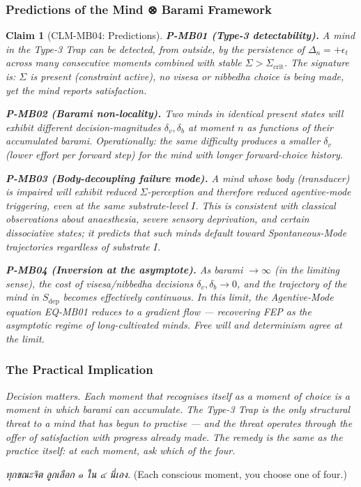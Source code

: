 \documentclass[12pt, a4paper]{article}
\newtheorem{claim}{Claim}[section]
\begin{document}
\subsubsection{Predictions of the Mind ⊗ Barami Framework}

\begin{claim}[CLM-MB04: Predictions]
\label{mbv1:clm:mb04}
\textbf{P-MB01 (Type-3 detectability).} A mind in the Type-3 Trap can
be detected, from outside, by the persistence of $\Delta_n =
+\epsilon_t$ across many consecutive moments combined with stable
$\Sigma > \Sigma_{\mathrm{crit}}$. The signature is: $\Sigma$ is
present (constraint active), no \emph{visesa} or \emph{nibbedha}
choice is being made, yet the mind reports satisfaction.

\textbf{P-MB02 (Barami non-locality).} Two minds in identical
\emph{present} states will exhibit different decision-magnitudes
$\delta_v, \delta_b$ at moment $n$ as functions of their accumulated
barami. Operationally: the same difficulty produces a smaller
$\delta_v$ (lower effort per forward step) for the mind with longer
forward-choice history.

\textbf{P-MB03 (Body-decoupling failure mode).} A mind whose body
(transducer) is impaired will exhibit reduced $\Sigma$-perception and
therefore reduced agentive-mode triggering, even at the same
substrate-level $I$. This is consistent with classical observations
about anaesthesia, severe sensory deprivation, and certain
dissociative states; it predicts that such minds default toward
Spontaneous-Mode trajectories regardless of substrate $I$.

\textbf{P-MB04 (Inversion at the asymptote).} As barami $\to \infty$
(in the limiting sense), the cost of \emph{visesa}/\emph{nibbedha}
decisions $\delta_v, \delta_b \to 0$, and the trajectory of the mind
in $S_{\mathrm{dep}}$ becomes effectively continuous. In this limit,
the Agentive-Mode equation EQ-MB01 reduces to a gradient flow ---
recovering FEP as the asymptotic regime of long-cultivated minds.
Free will and determinism agree at the limit.
\end{claim}

\subsubsection{The Practical Implication}

\begin{keybox}[title={The single operational instruction}]
\textit{Decision matters. Each moment that recognises itself as a
moment of choice is a moment in which barami can accumulate. The
Type-3 Trap is the only structural threat to a mind that has begun to
practise --- and the threat operates through the offer of
satisfaction with progress already made. The remedy is the same as
the practice itself: at each moment, ask \emph{which of the four}.}

\smallskip
\textit{ทุกขณะจิต ลูกเลือก ๑ ใน ๔ นี่เอง.}
(Each conscious moment, you choose one of four.)
\end{keybox}
\end{document}
